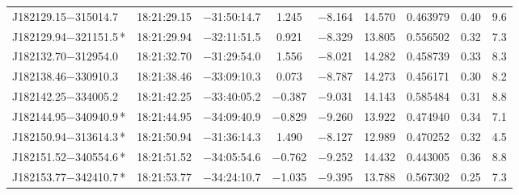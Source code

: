 \begin{table*}
\begin{tabular}{lcccccccr}
J182129.15$-$315014.7 & 18:21:29.15 & $-$31:50:14.7 &  1.245 & $-$8.164 & 14.570 & 0.463979 & 0.40 & 9.6 \\
J182129.94$-$321151.5\,* & 18:21:29.94 & $-$32:11:51.5 &  0.921 & $-$8.329 & 13.805 & 0.556502 & 0.32 & 7.3 \\
J182132.70$-$312954.0 & 18:21:32.70 & $-$31:29:54.0 &  1.556 & $-$8.021 & 14.282 & 0.458739 & 0.33 & 8.3 \\
J182138.46$-$330910.3 & 18:21:38.46 & $-$33:09:10.3 &  0.073 & $-$8.787 & 14.273 & 0.456171 & 0.30 & 8.2 \\
J182142.25$-$334005.2 & 18:21:42.25 & $-$33:40:05.2 & $-$0.387 & $-$9.031 & 14.143 & 0.585484 & 0.31 & 8.8 \\
J182144.95$-$340940.9\,* & 18:21:44.95 & $-$34:09:40.9 & $-$0.829 & $-$9.260 & 13.922 & 0.474940 & 0.34 & 7.1 \\
J182150.94$-$313614.3\,* & 18:21:50.94 & $-$31:36:14.3 &  1.490 & $-$8.127 & 12.989 & 0.470252 & 0.32 & 4.5 \\
J182151.52$-$340554.6\,* & 18:21:51.52 & $-$34:05:54.6 & $-$0.762 & $-$9.252 & 14.432 & 0.443005 & 0.36 & 8.8 \\
J182153.77$-$342410.7\,* & 18:21:53.77 & $-$34:24:10.7 & $-$1.035 & $-$9.395 & 13.788 & 0.567302 & 0.25 & 7.3 \\
\hline
\end{tabular}
\end{table*}

\addtocounter{table}{-1}

